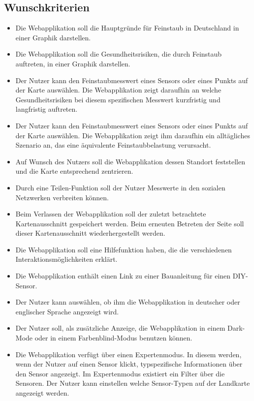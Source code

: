 \subsection{Wunschkriterien}
   \begin{itemize}
   	\item Die Webapplikation soll die Hauptgründe für \gls{Feinstaub} in Deutschland in einer Graphik darstellen.
   	\item Die Webapplikation soll die Gesundheitsrisiken, die durch \gls{Feinstaub} auftreten, in einer Graphik darstellen. 
	\item Der Nutzer kann den \gls{Feinstaub}messwert eines Sensors oder eines Punkts auf der Karte auswählen. 
	Die Webapplikation zeigt daraufhin an welche Gesundheitsrisiken bei diesem spezifischen Messwert kurzfristig und langfristig auftreten.
	\item Der Nutzer kann den \gls{Feinstaub}messwert eines Sensors oder eines Punkts auf der Karte auswählen. 
	Die Webapplikation zeigt ihm daraufhin ein alltägliches Szenario an, das eine äquivalente \gls{Feinstaub}belastung verursacht.
	\item Auf Wunsch des Nutzers soll die Webapplikation dessen Standort feststellen und die Karte entsprechend zentrieren.
	\item Durch eine Teilen-Funktion soll der Nutzer Messwerte in den sozialen Netzwerken verbreiten können.
	\item Beim Verlassen der Webapplikation soll der zuletzt betrachtete Kartenausschnitt gespeichert werden. Beim erneuten Betreten der Seite soll dieser Kartenausschnitt wiederhergestellt werden.
	\item Die Webapplikation soll eine Hilfefunktion haben, die die verschiedenen Interaktionsmöglichkeiten erklärt.
	\item Die Webapplikation enthält einen Link zu einer Bauanleitung für einen \gls{DIY}-\gls{Sensor}.
	\item Der Nutzer kann auswählen, ob ihm die Webapplikation in deutscher oder englischer Sprache angezeigt wird.
	\item Der Nutzer soll, als zusätzliche Anzeige, die Webapplikation in einem Dark-Mode oder in einem Farbenblind-Modus benutzen können.
	\item Die Webapplikation verfügt über einen Expertenmodus. In diesem werden, wenn der Nutzer auf einen Sensor klickt, typspezifische Informationen über den \gls{Sensor} angezeigt.
	Im Expertenmodus existiert ein Filter über die Sensoren. Der Nutzer kann einstellen welche \gls{Sensor}-Typen auf der Landkarte angezeigt werden.        
\end{itemize}
